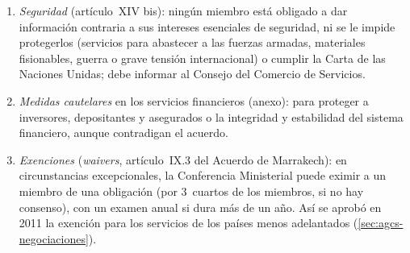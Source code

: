 \documentclass[11pt]{article}
\begin{document}
\begin{itemize}
\begin{enumerate}
    \begin{itemize}
    \item proteger la moral o mantener el orden público (este, solo ante una amenaza verdadera y suficientemente grave para un interés fundamental de la sociedad);
    \item proteger la vida y la salud de las personas y de los animales o preservar los vegetales;
    \item hacer cumplir leyes compatibles con el acuerdo, como las que previenen el fraude, protegen la intimidad y los datos personales o garantizan la seguridad;
    \item recaudar de forma equitativa o efectiva los impuestos directos (excepción al trato nacional) y aplicar los convenios para evitar la doble imposición (excepción a la NMF).
    \end{itemize}
    Como en el artículo~XX del GATT, las medidas no pueden ser una discriminación arbitraria o injustificable ni una restricción encubierta del comercio. A diferencia del GATT, no hay una excepción expresa para los recursos naturales agotables: el medio ambiente solo entra por la vida y la salud.\footnote{En \emph{Estados Unidos — Juegos de azar} (DS285, 2005), el Órgano de Apelación aceptó que la prohibición de las apuestas a distancia protegía la moral y el orden público, pero no la amparó porque Estados Unidos no demostró que la aplicara igual a los proveedores nacionales de apuestas hípicas a distancia\nocite{OMC2005DS285}.}
  \item \emph{Seguridad} (artículo~XIV bis): ningún miembro está obligado a dar información contraria a sus intereses esenciales de seguridad, ni se le impide protegerlos (servicios para abastecer a las fuerzas armadas, materiales fisionables, guerra o grave tensión internacional) o cumplir la Carta de las Naciones Unidas; debe informar al Consejo del Comercio de Servicios.
  \item \emph{Medidas cautelares} en los servicios financieros (anexo): para proteger a inversores, depositantes y asegurados o la integridad y estabilidad del sistema financiero, aunque contradigan el acuerdo.
  \item \emph{Exenciones} (\emph{waivers}, artículo~IX.3 del Acuerdo de Marrakech): en circunstancias excepcionales, la Conferencia Ministerial puede eximir a un miembro de una obligación (por 3~cuartos de los miembros, si no hay consenso), con un examen anual si dura más de un año\nocite{OMC1994Marrakech}. Así se aprobó en 2011 la exención para los servicios de los países menos adelantados (\ref{sec:agcs-negociaciones}).

\end{enumerate}
\end{itemize}
\end{document}
